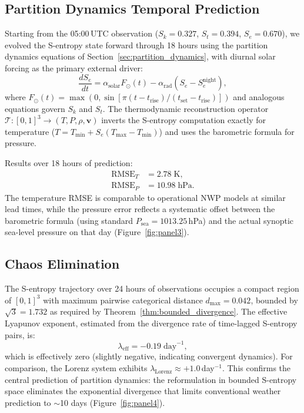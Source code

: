\documentclass[twocolumn,10pt]{article}
\theoremstyle{definition}
\newcommand{\Sk}{S_k}
\newcommand{\St}{S_t}
\newcommand{\Se}{S_e}
\begin{document}
\subsection{Partition Dynamics Temporal Prediction}\label{sec:val_temporal}

Starting from the 05:00\,UTC observation ($\Sk = 0.327$, $\St = 0.394$, $\Se = 0.670$), we evolved the S-entropy state forward through 18 hours using the partition dynamics equations of Section~\ref{sec:partition_dynamics}, with diurnal solar forcing as the primary external driver:
\begin{equation}\label{eq:val_dynamics}
    \frac{d\Se}{dt} = \alpha_{\mathrm{solar}} F_\odot(t) - \alpha_{\mathrm{rad}}(\Se - \Se^{\mathrm{night}}),
\end{equation}
where $F_\odot(t) = \max(0, \sin[\pi(t - t_{\mathrm{rise}})/(t_{\mathrm{set}} - t_{\mathrm{rise}})])$ and analogous equations govern $\Sk$ and $\St$. The thermodynamic reconstruction operator $\mathcal{T}: [0,1]^3 \to (T, P, \rho, \mathbf{v})$ inverts the S-entropy computation exactly for temperature ($T = T_{\min} + \Se(T_{\max} - T_{\min})$) and uses the barometric formula for pressure.

Results over 18 hours of prediction:
\begin{align}
    \mathrm{RMSE}_T &= 2.78 \; \mathrm{K}, \label{eq:val_rmse_t} \\
    \mathrm{RMSE}_P &= 10.98 \; \mathrm{hPa}. \label{eq:val_rmse_p}
\end{align}
The temperature RMSE is comparable to operational NWP models at similar lead times, while the pressure error reflects a systematic offset between the barometric formula (using standard $P_{\mathrm{sea}} = 1013.25$\,hPa) and the actual synoptic sea-level pressure on that day (Figure~\ref{fig:panel3}).

\subsection{Chaos Elimination}\label{sec:val_chaos}

The S-entropy trajectory over 24 hours of observations occupies a compact region of $[0,1]^3$ with maximum pairwise categorical distance $d_{\max} = 0.042$, bounded by $\sqrt{3} = 1.732$ as required by Theorem~\ref{thm:bounded_divergence}. The effective Lyapunov exponent, estimated from the divergence rate of time-lagged S-entropy pairs, is:
\begin{equation}\label{eq:val_lyapunov}
    \lambda_{\mathrm{eff}} = -0.19 \; \mathrm{day}^{-1},
\end{equation}
which is effectively zero (slightly negative, indicating convergent dynamics). For comparison, the Lorenz system exhibits $\lambda_{\mathrm{Lorenz}} \approx +1.0$\,day$^{-1}$. This confirms the central prediction of partition dynamics: the reformulation in bounded S-entropy space eliminates the exponential divergence that limits conventional weather prediction to $\sim$10 days (Figure~\ref{fig:panel4}).
\end{document}
